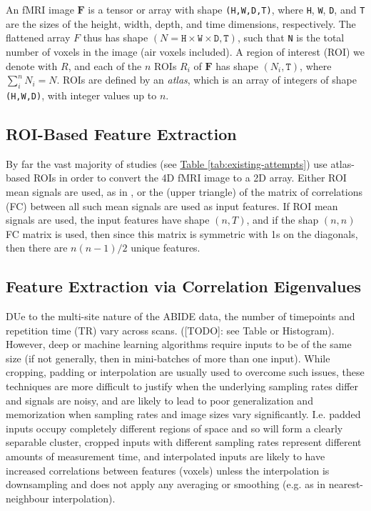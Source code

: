 \documentclass[10pt]{article}
\begin{document}
An fMRI image \(\bm{F}\) is a tensor or array with shape \texttt{(H,W,D,T)}, where \texttt{H},
\texttt{W}, \texttt{D}, and \texttt{T} are the sizes of the height, width, depth, and time
dimensions, respectively. The flattened array \(F\) thus has shape \((N = \texttt{H} \times
\texttt{W} \times \texttt{D}, \texttt{T})\), such that \texttt{N} is the total number of voxels in
the image (air voxels included). A region of interest (ROI) we denote with \(R\), and each of the
\(n\) ROIs \(R_i\) of \(\bm{F}\) has shape \((N_i, \texttt{T})\), where \(\sum_i^n N_i= N\). ROIs
are defined by an \emph{atlas}, which is an array of integers of shape \texttt{(H,W,D)}, with
integer values up to \(n\).

\subsection{ROI-Based Feature Extraction}

By far the vast majority of studies (see \hyperref[tab:existing-attempts]{Table
\ref{tab:existing-attempts}}) use atlas-based ROIs in order to convert the 4D fMRI image to a 2D
array. Either ROI mean signals are used, as in \citet{el-gazzarHybrid3DCNN3DCLSTM2019}, or the
(upper triangle) of the matrix of correlations (FC) between all such mean signals are used as input
features. If ROI mean signals are used, the input features have shape \((n, T)\), and if the shap \((n, n)\) FC
matrix is used, then since this matrix is symmetric with 1s on the diagonals, then there are \(n(n-1)/2\) unique features.

\subsection{}

\subsection{Feature Extraction via Correlation Eigenvalues}

DUe to the multi-site nature of the ABIDE data, the number of timepoints and repetition time (TR)
vary across scans. ([TODO]: see Table or Histogram). However, deep or machine learning algorithms
require inputs to be of the same size (if not generally, then in mini-batches of more than one
input). While cropping, padding or interpolation are usually used to overcome such issues, these
techniques are more difficult to justify when the underlying sampling rates differ and signals are
noisy, and are likely to lead to poor generalization and memorization when sampling rates and image
sizes vary significantly. I.e. padded inputs occupy completely different regions of space and so
will form a clearly separable cluster, cropped inputs with different sampling rates represent
different amounts of measurement time, and interpolated inputs are likely to have increased
correlations between features (voxels) unless the interpolation is downsampling and does not apply
any averaging or smoothing (e.g. as in nearest-neighbour interpolation).
\end{document}
